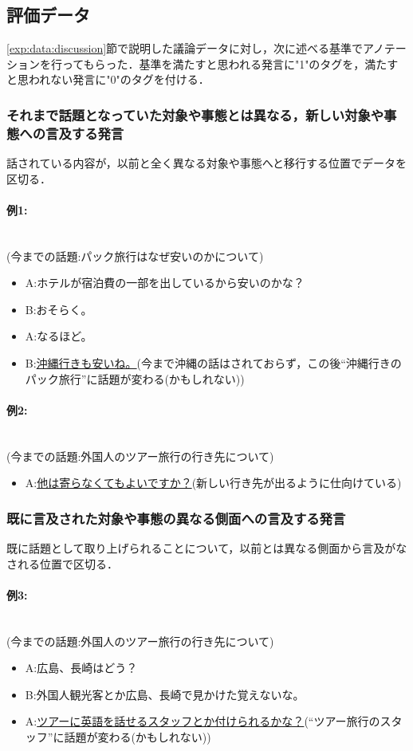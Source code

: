 \subsection{評価データ}
\label{exp:data:evaluation}
 \ref{exp:data:discussion}節で説明した議論データに対し，次に述べる基準でアノテーションを行ってもらった．基準を満たすと思われる発言に"1"のタグを，満たすと思われない発言に"0"のタグを付ける．
\subsubsection*{ それまで話題となっていた対象や事態とは異なる，新しい対象や事態への言及する発言}
話されている内容が，以前と全く異なる対象や事態へと移行する位置でデータを区切る．
\paragraph{例1:}\ \\
(今までの話題:パック旅行はなぜ安いのかについて)
\begin{itemize}
\item A:ホテルが宿泊費の一部を出しているから安いのかな？
\item B:おそらく。
\item A:なるほど。
\item B:\underline{沖縄行きも安いね。}(今まで沖縄の話はされておらず，この後“沖縄行きのパック旅行”に話題が変わる(かもしれない))
\end{itemize}
\paragraph{例2:}\ \\
(今までの話題:外国人のツアー旅行の行き先について)
\begin{itemize}
\item A:\underline{他は寄らなくてもよいですか？}(新しい行き先が出るように仕向けている)
\end{itemize}

 \subsubsection*{ 既に言及された対象や事態の異なる側面への言及する発言}
既に話題として取り上げられることについて，以前とは異なる側面から言及がなされる位置で区切る．
\paragraph{例3:}\ \\
(今までの話題:外国人のツアー旅行の行き先について)
\begin{itemize}
\item A:広島、長崎はどう？
\item B:外国人観光客とか広島、長崎で見かけた覚えないな。
\item A:\underline{ツアーに英語を話せるスタッフとか付けられるかな？}(“ツアー旅行のスタッフ”に話題が変わる(かもしれない))
\end{itemize}


